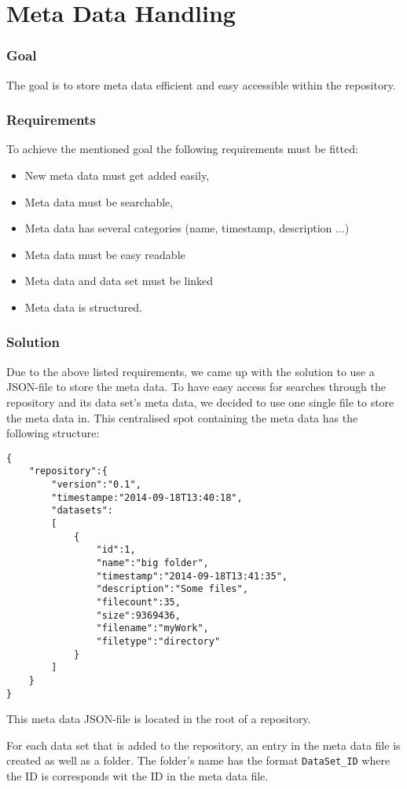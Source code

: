 \documentclass{article} %
\begin{document}
\part{Meta Data Handling}
\section{Goal}
The goal is to store meta data efficient and easy accessible within the repository.
\section{Requirements}
To achieve the mentioned goal the following requirements must be fitted:
\begin{itemize}
	\item New meta data must get added easily,
	\item Meta data must be searchable,
	\item Meta data has several categories (name, timestamp, description ...)
	\item Meta data must be easy readable
	\item Meta data and data set must be linked
	\item Meta data is structured.
\end{itemize}
\section{Solution}
Due to the above listed requirements, we came up with the solution to use a JSON-file to store the meta data.
To have easy access for searches through the repository and its data set's meta data, we decided to use one single
file to store the meta data in. This centralised spot containing the meta data has the following structure:
\begin{lstlisting}
{
    "repository":{
		"version":"0.1",
		"timestampe:"2014-09-18T13:40:18",
		"datasets":
		[
			{
				"id":1,
				"name":"big folder",
				"timestamp":"2014-09-18T13:41:35",
				"description":"Some files",
				"filecount":35,
				"size":9369436,
				"filename":"myWork",
				"filetype":"directory"
			}
		]
	}
}
\end{lstlisting}
This meta data JSON-file is located in the root of a repository.

\noindent For each data set that is added to the repository, an entry in the meta data file is created as well as a folder. The folder's name has the format \texttt{DataSet\_ID} where the ID is corresponds wit the ID in the meta data file.
\end{document}
